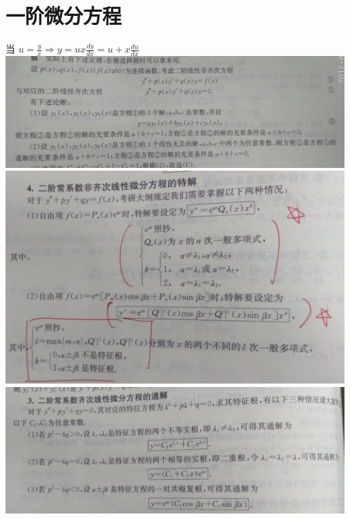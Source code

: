 \documentclass[UTF8]{ctexart}
\begin{document}
\section{一阶微分方程}
    当 $ u=\frac{y}{x} \Rightarrow y=ux\frac{dy}{dx}=u+x\frac{du}{dx}$
\includegraphics[width=13cm]{9345E7/478763472.jpg}
\includegraphics[width=13cm]{9345E7/595734581.jpg}
\includegraphics[width=13cm]{9345E7/601054614.jpg}
\end{document}
